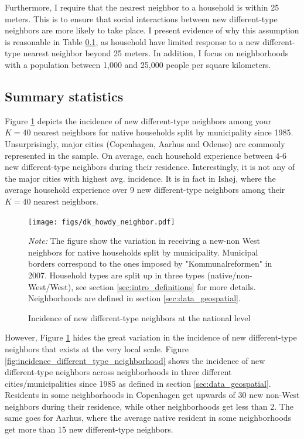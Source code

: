 \documentclass[main.tex]{subfiles}
\begin{document}
Furthermore, I require that the nearest neighbor to a household is within 25 meters. This is to ensure that social interactions between new different-type neighbors are more likely to take place. I present evidence of why this assumption is reasonable in Table \ref{}, as household have limited response to a new different-type nearest neighbor beyond 25 meters. In addition, I focus on neighborhoods with a population between 1,000 and 25,000 people per square kilometers. 

\subsection{Summary statistics}
Figure \ref{fig:incidence_different_type_dk} depicts the incidence of new different-type neighbors among your $K=40$ nearest neighbors for native households split by municipality since 1985. Unsurprisingly, major cities (Copenhagen, Aarhus and Odense) are commonly represented in the sample. On average, each household experience between 4-6 new different-type neighbors during their residence. Interestingly, it is not any of the major cities with highest avg. incidence. It is in fact in Ishøj, where the average household experience over 9 new different-type neighbors among their $K=40$ nearest neighbors. 

\begin{figure}[H]
    \centering
    \caption{Incidence of new different-type neighbors at the national level}
    \texttt{[image: figs/dk\_howdy\_neighbor.pdf]}
    \label{fig:incidence_different_type_dk}
\begin{tablenotes}
\item \footnotesize \textit{Note:} The figure show the variation in receiving a new-non West neighbors for native households split by municipality. Municipal borders correspond to the ones imposed by "Kommunalreformen" in 2007.  Household types are split up in three types (native/non-West/West), see section \ref{sec:intro_definitions} for more details. Neighborhoods are defined in section \ref{sec:data_geospatial}.
\end{tablenotes}
\end{figure}

However, Figure \ref{fig:incidence_different_type_dk} hides the great variation in the incidence of new different-type neighbors that exists at the very local scale. Figure \ref{fig:incidence_different_type_neighborhood} shows the incidence of new different-type neighbors across neighborhoods in three different cities/municipalities since 1985 as defined in section \ref{sec:data_geospatial}. Residents in some neighborhoods in Copenhagen get upwards of 30 new non-West neighbors during their residence, while other neighborhoods get less than 2. The same goes for Aarhus, where the average native resident in some neighborhoods get more than 15 new different-type neighbors.
\end{document}
